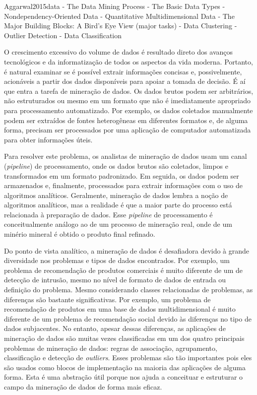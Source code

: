 Aggarwal2015data
- The Data Mining Process
- The Basic Data Types
  - Nondependency-Oriented Data
    - Quantitative Multidimensional Data
- The Major Building Blocks: A Bird’s Eye View (major tasks)
  - Data Clustering
  - Outlier Detection
  - Data Classification

O crescimento excessivo do volume de dados é resultado direto dos avanços tecnológicos e da informatização de todos os aspectos da vida moderna. Portanto, é natural examinar se é possível extrair informações concisas e, possivelmente, acionáveis a partir dos dados disponíveis para apoiar a tomada de decisão. É aí que entra a tarefa de mineração de dados. Os dados brutos podem ser arbitrários, não estruturados ou mesmo em um formato que não é imediatamente apropriado para processamento automatizado. Por exemplo, os dados coletados manualmente podem ser extraídos de fontes heterogêneas em diferentes formatos e, de alguma forma, precisam ser processados por uma aplicação de computador automatizada para obter informações úteis.

Para resolver este problema, os analistas de mineração de dados usam um canal (\textit{pipeline}) de processamento, onde os dados brutos são coletados, limpos e transformados em um formato padronizado. Em seguida, os dados podem ser armazenados e, finalmente, processados para extrair informações com o uso de algoritmos analíticos. Geralmente, mineração de dados lembra a noção de algoritmos analíticos, mas a realidade é que a maior parte do processo está relacionada à preparação de dados. Esse \textit{pipeline} de processamento é conceitualmente análogo ao de um processo de mineração real, onde de um minério mineral é obtido o produto final refinado.

Do ponto de vista analítico, a mineração de dados é desafiadora devido à grande diversidade nos problemas e tipos de dados encontrados. Por exemplo, um problema de recomendação de produtos comerciais é muito diferente de um de detecção de intrusão, mesmo no nível de formato de dados de entrada ou definição do problema. Mesmo considerando classes relacionadas de problemas, as diferenças são bastante significativas. Por exemplo, um problema de recomendação de produtos em uma base de dados multidimensional é muito diferente de um problema de recomendação social devido às diferenças no tipo de dados subjacentes. No entanto, apesar dessas diferenças, as aplicações de mineração de dados são muitas vezes classificadas em um dos quatro principais problemas de mineração de dados: regras de associação, agrupamento, classificação e detecção de \textit{outliers}. Esses problemas são tão importantes pois eles são usados como blocos de implementação na maioria das aplicações de alguma forma. Esta é uma abstração útil porque nos ajuda a conceituar e estruturar o campo da mineração de dados de forma mais eficaz.

